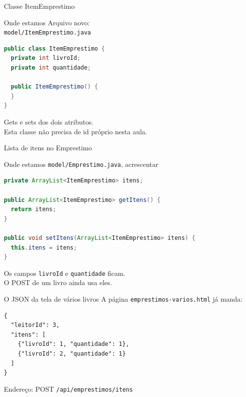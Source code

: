 \documentclass[aspectratio=169,11pt]{beamer}
\newcommand{\onde}[1]{%
  \begin{block}{Onde estamos}
    #1
  \end{block}
}
\begin{document}
\begin{frame}[fragile]{Classe ItemEmprestimo}
  \onde{Arquivo novo:\\
        \texttt{model/ItemEmprestimo.java}}

\begin{lstlisting}[language=Java,basicstyle=\ttfamily\footnotesize]
public class ItemEmprestimo {
  private int livroId;
  private int quantidade;

  public ItemEmprestimo() {
  }
}
\end{lstlisting}

  Gets e sets dos dois atributos.\\
  Esta classe não precisa de id próprio nesta aula.
\end{frame}

\begin{frame}[fragile]{Lista de itens no Emprestimo}
  \onde{\texttt{model/Emprestimo.java}, acrescentar}

\begin{lstlisting}[language=Java,basicstyle=\ttfamily\footnotesize]
private ArrayList<ItemEmprestimo> itens;

public ArrayList<ItemEmprestimo> getItens() {
  return itens;
}

public void setItens(ArrayList<ItemEmprestimo> itens) {
  this.itens = itens;
}
\end{lstlisting}

  \vspace{0.4em}
  Os campos \texttt{livroId} e \texttt{quantidade} ficam.\\
  O POST de um livro ainda usa eles.
\end{frame}

\begin{frame}[fragile]{O JSON da tela de vários livros}
  A página \texttt{emprestimos-varios.html} já manda:

  \vspace{0.3em}
\begin{lstlisting}[basicstyle=\ttfamily\footnotesize]
{
  "leitorId": 3,
  "itens": [
    {"livroId": 1, "quantidade": 1},
    {"livroId": 2, "quantidade": 1}
  ]
}
\end{lstlisting}

  \vspace{0.4em}
  Endereço: POST \texttt{/api/emprestimos/itens}
\end{frame}
\end{document}
